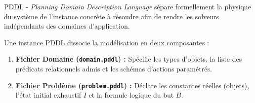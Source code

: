 PDDL - \emph{Planning Domain Description Language} sépare formellement la physique du système de l'instance concrète à résoudre afin de rendre les solveurs indépendants des domaines d'application.

\begin{definition}
    Une instance PDDL dissocie la modélisation en deux composantes :
    \begin{enumerate}
        \item \textbf{Fichier Domaine (\texttt{domain.pddl}) :} Spécifie les types d'objets, la liste des prédicats relationnels admis et les schémas d'actions paramétrés.
        \item \textbf{Fichier Problème (\texttt{problem.pddl}) :} Déclare les constantes réelles (objets), l'état initial exhaustif $I$ et la formule logique du but $B$.
    \end{enumerate}
\end{definition}


